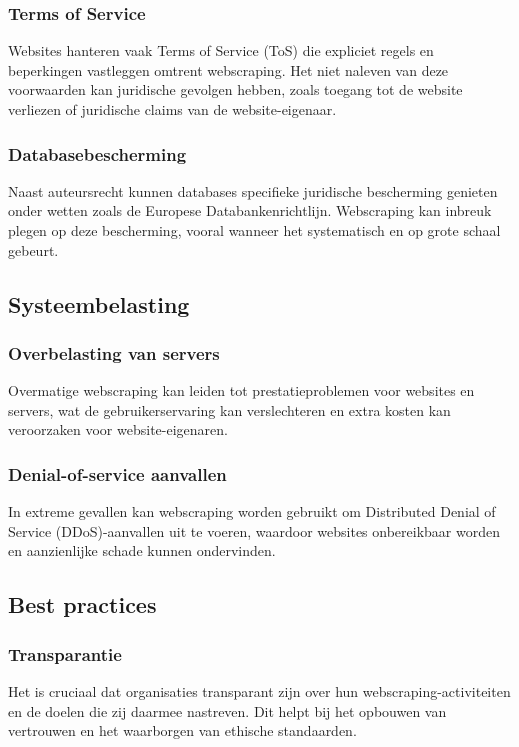 \subsubsection{Terms of Service}
Websites hanteren vaak Terms of Service (ToS) die expliciet regels en beperkingen vastleggen omtrent webscraping. Het niet naleven van deze voorwaarden kan juridische gevolgen hebben, zoals toegang tot de website verliezen of juridische claims van de website-eigenaar.

\subsubsection{Databasebescherming}
Naast auteursrecht kunnen databases specifieke juridische bescherming genieten onder wetten zoals de Europese Databankenrichtlijn. Webscraping kan inbreuk plegen op deze bescherming, vooral wanneer het systematisch en op grote schaal gebeurt.

\subsection{Systeembelasting}
\subsubsection{Overbelasting van servers}
Overmatige webscraping kan leiden tot prestatieproblemen voor websites en servers, wat de gebruikerservaring kan verslechteren en extra kosten kan veroorzaken voor website-eigenaren.

\subsubsection{Denial-of-service aanvallen}
In extreme gevallen kan webscraping worden gebruikt om Distributed Denial of Service (DDoS)-aanvallen uit te voeren, waardoor websites onbereikbaar worden en aanzienlijke schade kunnen ondervinden.

\subsection{Best practices}
\subsubsection{Transparantie}
Het is cruciaal dat organisaties transparant zijn over hun webscraping-activiteiten en de doelen die zij daarmee nastreven. Dit helpt bij het opbouwen van vertrouwen en het waarborgen van ethische standaarden.

